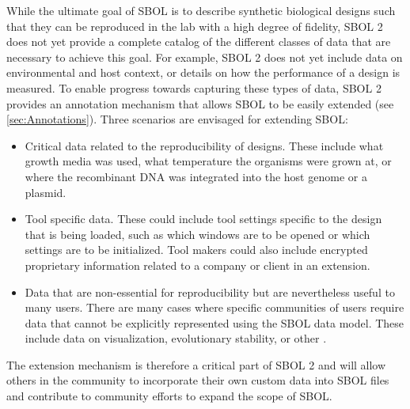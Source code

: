 While the ultimate goal of SBOL is to describe synthetic biological designs such that they can be reproduced in the lab with a high degree of fidelity, SBOL 2 does not yet provide a complete catalog of the different classes of data that are necessary to achieve this goal. 
For example, SBOL 2 does not yet include data on environmental and host context, or details on how the performance of a design is measured. 
To enable progress towards capturing these types of data, SBOL 2 provides an annotation mechanism that allows SBOL to be easily extended (see \ref{sec:Annotations}). Three scenarios are envisaged for extending SBOL:

\begin{itemize}
\item Critical data related to the reproducibility of designs. These include  what growth media was used, what temperature the organisms were grown at, or where the recombinant DNA was integrated into the host genome or a plasmid.
\item Tool specific data. These could include tool settings specific to the design that is being loaded, such as which windows are to be opened or which settings are to be initialized. Tool makers could also include encrypted proprietary information related to a company or client in an extension. 
\item Data that are non-essential for  reproducibility but are nevertheless useful to many users. There are many cases where specific communities of users require data that cannot be explicitly represented using the SBOL data model. These include data on visualization, evolutionary stability, or other .
\end{itemize}

The extension mechanism is therefore a critical part of SBOL 2 and will allow others in the community to incorporate their own custom data into SBOL files and contribute to community efforts to expand the scope of SBOL.


